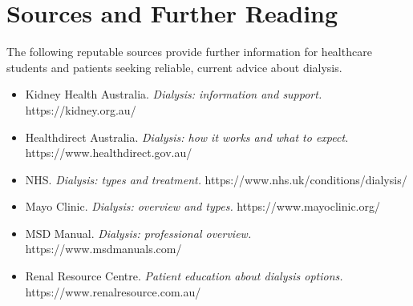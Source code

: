\section*{Sources and Further Reading}
The following reputable sources provide further information for healthcare students and patients seeking reliable, current advice about dialysis.

\begin{itemize}
    \item Kidney Health Australia. \textit{Dialysis: information and support.} https://kidney.org.au/
    \item Healthdirect Australia. \textit{Dialysis: how it works and what to expect.} https://www.healthdirect.gov.au/
    \item NHS. \textit{Dialysis: types and treatment.} https://www.nhs.uk/conditions/dialysis/
    \item Mayo Clinic. \textit{Dialysis: overview and types.} https://www.mayoclinic.org/
    \item MSD Manual. \textit{Dialysis: professional overview.} https://www.msdmanuals.com/
    \item Renal Resource Centre. \textit{Patient education about dialysis options.} https://www.renalresource.com.au/
\end{itemize}
